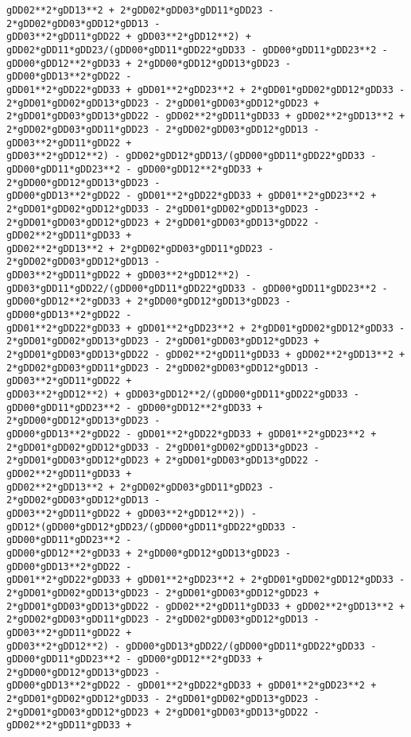 \documentclass[landscape,letterpaper,10pt,english]{article}
\begin{document}
\begin{Verbatim}[commandchars=\\\{\}]
gDD02**2*gDD13**2 + 2*gDD02*gDD03*gDD11*gDD23 - 2*gDD02*gDD03*gDD12*gDD13 -
gDD03**2*gDD11*gDD22 + gDD03**2*gDD12**2) +
gDD02*gDD11*gDD23/(gDD00*gDD11*gDD22*gDD33 - gDD00*gDD11*gDD23**2 -
gDD00*gDD12**2*gDD33 + 2*gDD00*gDD12*gDD13*gDD23 - gDD00*gDD13**2*gDD22 -
gDD01**2*gDD22*gDD33 + gDD01**2*gDD23**2 + 2*gDD01*gDD02*gDD12*gDD33 -
2*gDD01*gDD02*gDD13*gDD23 - 2*gDD01*gDD03*gDD12*gDD23 +
2*gDD01*gDD03*gDD13*gDD22 - gDD02**2*gDD11*gDD33 + gDD02**2*gDD13**2 +
2*gDD02*gDD03*gDD11*gDD23 - 2*gDD02*gDD03*gDD12*gDD13 - gDD03**2*gDD11*gDD22 +
gDD03**2*gDD12**2) - gDD02*gDD12*gDD13/(gDD00*gDD11*gDD22*gDD33 -
gDD00*gDD11*gDD23**2 - gDD00*gDD12**2*gDD33 + 2*gDD00*gDD12*gDD13*gDD23 -
gDD00*gDD13**2*gDD22 - gDD01**2*gDD22*gDD33 + gDD01**2*gDD23**2 +
2*gDD01*gDD02*gDD12*gDD33 - 2*gDD01*gDD02*gDD13*gDD23 -
2*gDD01*gDD03*gDD12*gDD23 + 2*gDD01*gDD03*gDD13*gDD22 - gDD02**2*gDD11*gDD33 +
gDD02**2*gDD13**2 + 2*gDD02*gDD03*gDD11*gDD23 - 2*gDD02*gDD03*gDD12*gDD13 -
gDD03**2*gDD11*gDD22 + gDD03**2*gDD12**2) -
gDD03*gDD11*gDD22/(gDD00*gDD11*gDD22*gDD33 - gDD00*gDD11*gDD23**2 -
gDD00*gDD12**2*gDD33 + 2*gDD00*gDD12*gDD13*gDD23 - gDD00*gDD13**2*gDD22 -
gDD01**2*gDD22*gDD33 + gDD01**2*gDD23**2 + 2*gDD01*gDD02*gDD12*gDD33 -
2*gDD01*gDD02*gDD13*gDD23 - 2*gDD01*gDD03*gDD12*gDD23 +
2*gDD01*gDD03*gDD13*gDD22 - gDD02**2*gDD11*gDD33 + gDD02**2*gDD13**2 +
2*gDD02*gDD03*gDD11*gDD23 - 2*gDD02*gDD03*gDD12*gDD13 - gDD03**2*gDD11*gDD22 +
gDD03**2*gDD12**2) + gDD03*gDD12**2/(gDD00*gDD11*gDD22*gDD33 -
gDD00*gDD11*gDD23**2 - gDD00*gDD12**2*gDD33 + 2*gDD00*gDD12*gDD13*gDD23 -
gDD00*gDD13**2*gDD22 - gDD01**2*gDD22*gDD33 + gDD01**2*gDD23**2 +
2*gDD01*gDD02*gDD12*gDD33 - 2*gDD01*gDD02*gDD13*gDD23 -
2*gDD01*gDD03*gDD12*gDD23 + 2*gDD01*gDD03*gDD13*gDD22 - gDD02**2*gDD11*gDD33 +
gDD02**2*gDD13**2 + 2*gDD02*gDD03*gDD11*gDD23 - 2*gDD02*gDD03*gDD12*gDD13 -
gDD03**2*gDD11*gDD22 + gDD03**2*gDD12**2)) -
gDD12*(gDD00*gDD12*gDD23/(gDD00*gDD11*gDD22*gDD33 - gDD00*gDD11*gDD23**2 -
gDD00*gDD12**2*gDD33 + 2*gDD00*gDD12*gDD13*gDD23 - gDD00*gDD13**2*gDD22 -
gDD01**2*gDD22*gDD33 + gDD01**2*gDD23**2 + 2*gDD01*gDD02*gDD12*gDD33 -
2*gDD01*gDD02*gDD13*gDD23 - 2*gDD01*gDD03*gDD12*gDD23 +
2*gDD01*gDD03*gDD13*gDD22 - gDD02**2*gDD11*gDD33 + gDD02**2*gDD13**2 +
2*gDD02*gDD03*gDD11*gDD23 - 2*gDD02*gDD03*gDD12*gDD13 - gDD03**2*gDD11*gDD22 +
gDD03**2*gDD12**2) - gDD00*gDD13*gDD22/(gDD00*gDD11*gDD22*gDD33 -
gDD00*gDD11*gDD23**2 - gDD00*gDD12**2*gDD33 + 2*gDD00*gDD12*gDD13*gDD23 -
gDD00*gDD13**2*gDD22 - gDD01**2*gDD22*gDD33 + gDD01**2*gDD23**2 +
2*gDD01*gDD02*gDD12*gDD33 - 2*gDD01*gDD02*gDD13*gDD23 -
2*gDD01*gDD03*gDD12*gDD23 + 2*gDD01*gDD03*gDD13*gDD22 - gDD02**2*gDD11*gDD33 +

\end{Verbatim}
\end{document}
